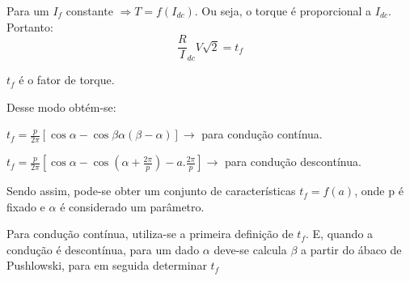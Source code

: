 Para um $I_{f}$ constante $\Rightarrow T = f(I_{dc})$. Ou seja, o torque é proporcional a $I_{dc}$. Portanto:
\[\frac{R}I_{dc}{V\sqrt{2}} = t_{f}\]

$t_{f}$ é o fator de torque.

Desse modo obtém-se:

$t_{f} = \frac{p}{2\pi}\left[\cos{\alpha} - \cos{\beta} \alpha\left(\beta - \alpha\right)\right] \rightarrow$ para condução contínua.

$t_{f} = \frac{p}{2\pi}\left[\cos{\alpha} - \cos\left(\alpha + \frac{2\pi}{p}\right) - a.\frac{2\pi}{p} \right] \rightarrow$ para condução descontínua.

Sendo assim, pode-se obter um conjunto de características $t_{f} = f(a)$, onde p é fixado e $\alpha$ é considerado um parâmetro. 

Para condução contínua, utiliza-se a primeira definição de $t_{f}$. E, quando a condução é descontínua, para um dado $\alpha$ deve-se calcula $\beta$ a partir do ábaco de Pushlowski, para em seguida determinar $t_{f}$

